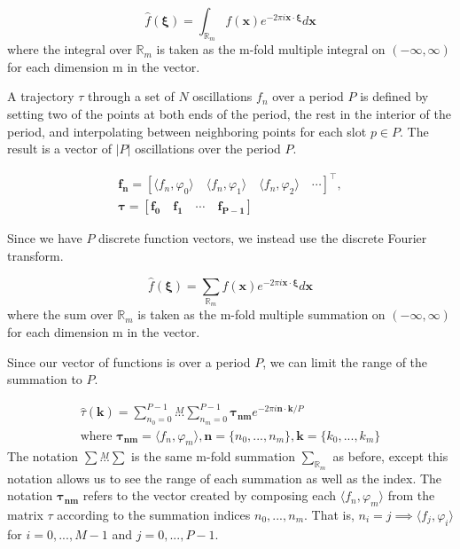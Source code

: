\documentclass{article}
\begin{document}
\begin{equation}
  \label{Multidimensional Fourier Transform}
  \hat{f}(\bm{\xi}) = \int_{\mathbb{R}_m} f(\bm{x}) e^{-2 \pi i \bm{x} \cdot \bm{\xi}} d\bm{x}
\end{equation}
where the integral over $\mathbb{R}_m$ is taken as the m-fold multiple integral on $(-\infty, \infty)$ for each dimension m in the vector.

A trajectory $\tau$ through a set of $N$ oscillations $f_n$ over a period $P$ is defined by setting two of the points at both ends of the period, the rest in the interior of the period, and interpolating between neighboring points for each slot $p \in P$. The result is a vector of $|P|$ oscillations over the period $P$.  

\begin{equation}
\begin{gathered}
  \bm{f_n} = [ \langle f_n, \varphi_0 \rangle \quad \langle f_n, \varphi_1 \rangle \quad \langle f_n, \varphi_2 \rangle \quad \cdots ]^\top , \\
  \bm{\tau} = [ \bm{f_0} \quad \bm{f_1} \quad \cdots \quad \bm{f_{P-1}} ]
\end{gathered}
\end{equation}

Since we have $P$ discrete function vectors, we instead use the discrete Fourier transform.

\begin{equation}
  \hat{f}(\bm{\xi}) = \sum_{\mathbb{R}_m} f(\bm{x}) e^{-2 \pi i \bm{x} \cdot \bm{\xi}} d\bm{x}
\end{equation}
where the sum over $\mathbb{R}_m$ is taken as the m-fold multiple summation on $(-\infty, \infty)$ for each dimension m in the vector.

Since our vector of functions is over a period $P$, we can limit the range of the summation to $P$.

\begin{equation}
\begin{gathered}
  \hat{\tau}(\bm{k}) = \sum_{n_0 = 0}^{P-1} \overset{M}{...} \sum_{n_m = 0}^{P-1} \bm{\tau_{nm}} e^{-2 \pi i \bm{n} \cdot \bm{k} / P}  \\
  \text{where } \bm{\tau_{nm}} = \langle f_n, \varphi_m \rangle, \bm{n} = \{n_0, ..., n_m\}, \bm{k} = \{k_0, ..., k_m\}
\end{gathered}
\end{equation}
The notation $\sum \overset{M}{...} \sum$ is the same m-fold summation $\sum_{\mathbb{R}_m}$ as before, except this notation allows us to see the range of each summation as well as the index.
The notation $\bm{\tau_{nm}}$ refers to the vector created by composing each $\langle f_n, \varphi_m \rangle$ from the matrix $\tau$ according to the summation indices $n_0, ..., n_m$. That is, $n_i = j \implies \langle f_j, \varphi_i \rangle$ for $i = 0, ..., M-1$ and $j = 0, ..., P-1$. 
\end{document}
